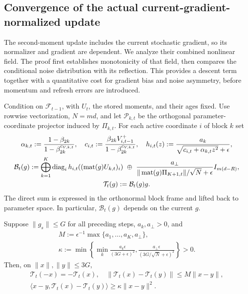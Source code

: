 \subsection{Convergence of the actual current-gradient-normalized update}
The second-moment update includes the current stochastic gradient, so its
normalizer and gradient are dependent. We analyze their combined nonlinear
field. The proof first establishes monotonicity of that field, then compares
the conditional noise distribution with its reflection. This provides a
descent term together with a quantitative cost for gradient bias and noise
asymmetry, before momentum and refresh errors are introduced.

\begin{definition}\label{def:actual-field}
Condition on $\mathcal F_{t-1}$, with $U_t$, the stored moments, and their ages
fixed. Use rowwise vectorization, $N=md$, and let $\mathcal P_{k,t}$ be the
orthogonal parameter-coordinate projector induced by $\Pi_{k,t}$.
For each active coordinate $i$ of block $k$ set
\begin{gather}
 \alpha_{k,t}:=\frac{1-\beta_{2k}}{1-\beta_{2k}^{c_{V,k,t}}},\quad
 c_{i,t}:=\frac{\beta_{2k}V_{i,t-1}^+}{1-\beta_{2k}^{c_{V,k,t}}},\quad
 h_{i,t}(z):=\frac{a_k}{\sqrt{c_{i,t}+\alpha_{k,t}z^2}+\epsilon},\\
 \mathcal B_t(g):=\bigoplus_{k=1}^K\operatorname{diag}_i h_{i,t}((\operatorname{mat}(g)U_{k,t})_i)
 \ \oplus\ \frac{a_\perp}{\|\operatorname{mat}(g)\Pi_{K+1,t}\|/\sqrt N+\epsilon}I_{m(d-R)},\\
 \mathcal T_t(g):=\mathcal B_t(g)g.
\end{gather}
The direct sum is expressed in the orthonormal block frame and lifted back to
parameter space. In particular, $\mathcal B_t(g)$ depends on the current $g$.
\end{definition}
\begin{lemma}\label{lem:actual-normalization}
Suppose $\|g_s\|\le G$ for all preceding steps, $a_k,a_\perp>0$, and
\begin{gather}
 M:=\epsilon^{-1}\max\{a_1,\ldots,a_K,a_\perp\},\\
 \kappa:=\min\left\{\min_k\frac{a_k\epsilon}{(3G+\epsilon)^2},
                 \frac{a_\perp\epsilon}{(3G/\sqrt N+\epsilon)^2}\right\}>0.
\end{gather}
Then, on $\|x\|,\|y\|\le3G$,
\begin{gather}
 \mathcal T_t(-x)=-\mathcal T_t(x),\quad
 \|\mathcal T_t(x)-\mathcal T_t(y)\|\le M\|x-y\|,\\
 \langle x-y,\mathcal T_t(x)-\mathcal T_t(y)\rangle
                              \ge\kappa\|x-y\|^2.
\end{gather}
\end{lemma}
